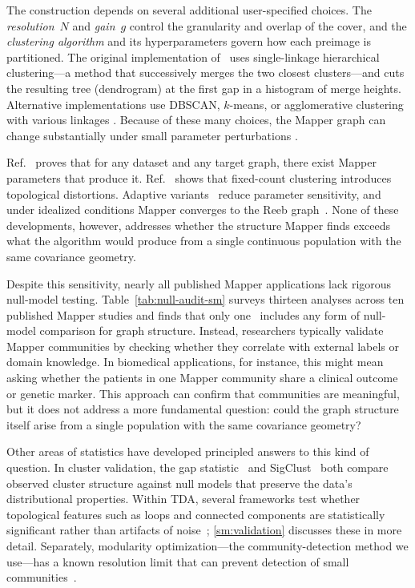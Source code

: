\documentclass[hidelinks]{siamart251216}
\begin{document}
The construction depends on several additional user-specified choices.
The \emph{resolution}~$N$ and \emph{gain}~$g$ control the
granularity and overlap of the cover, and the \emph{clustering algorithm}
and its hyperparameters govern how each preimage is partitioned.  The
original implementation of~\cite{Singh2007} uses single-linkage
hierarchical clustering---a method that successively merges the two
closest clusters---and cuts the resulting tree (dendrogram) at the first
gap in a histogram of merge heights.  Alternative implementations use
DBSCAN, $k$-means, or agglomerative clustering with various linkages
\citep{vanVeen2019, Tauzin2021}.  Because of these many choices, the
Mapper graph can change substantially under small parameter perturbations
\citep{Dey2016, Chazal2021}.

Ref.~\cite{Alvarado2024} proves that
for any dataset and any target graph, there exist Mapper parameters that
produce it.  Ref.~\cite{VejdemoJohansson2025} shows that fixed-count
clustering introduces topological distortions.  Adaptive variants~\citep{Alvarado2025, Tao2025} reduce parameter
sensitivity, and under idealized conditions Mapper converges to the Reeb
graph~\citep{CarriereOudot2018, Brown2021, CarriereMichelOudot2018,
Dey2017}.  None of these developments, however, addresses whether the structure Mapper
finds exceeds what the algorithm would produce from a single continuous
population with the same covariance geometry.

Despite this sensitivity, nearly all published Mapper applications lack
rigorous null-model testing.
Table~\ref{tab:null-audit-sm} surveys thirteen analyses across ten
published Mapper studies and finds that only one~\citep{Lum2013}
includes any form of null-model comparison for graph structure.
Instead, researchers typically validate Mapper communities by checking
whether they correlate with external labels or domain knowledge.  In
biomedical applications, for instance, this might mean asking whether
the patients in one Mapper community share a clinical outcome or genetic
marker.  This approach can confirm that communities are meaningful, but
it does not address a more fundamental question: could the graph
structure itself arise from a single population with the same covariance
geometry?

Other areas of statistics have developed principled answers to this
kind of question.  In cluster validation, the gap
statistic~\citep{Tibshirani2001} and SigClust~\citep{Liu2008} both
compare observed cluster structure against null models that preserve the
data's distributional properties.  Within TDA, several frameworks test
whether topological features such as loops and connected components are
statistically significant rather than
artifacts of noise~\citep{Bobrowski2023, CarriereMichelOudot2018,
Chazal2021}; \cref{sm:validation} discusses these in more detail.
Separately, modularity optimization---the community-detection method we
use---has a known resolution limit that can prevent
detection of small communities~\citep{Fortunato2007}.
\end{document}
